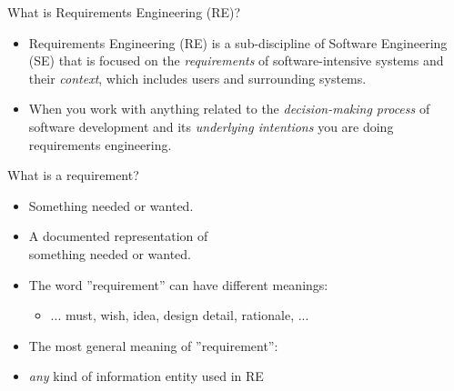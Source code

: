 \documentclass{beamer}
\begin{document}
\begin{frame}[fragile]{What is Requirements Engineering (RE)?}
\begin{itemize}
\item  Requirements Engineering (RE) is a sub-discipline of Software Engineering (SE) that is focused on the \textit{requirements} of software-intensive systems and their \textit{context}, which includes users and surrounding systems.
\item When you work with anything related to the \textit{decision-making process} of software development and its \emph{underlying intentions} you are doing requirements engineering.
\end{itemize}
\end{frame}

\begin{frame}[fragile]{What is a requirement?}
\begin{itemize}
\item Something needed or wanted.
\item A documented representation of \\something needed or wanted.
\item The word ''requirement'' can have different meanings:
\begin{itemize}
\item ... must, wish, idea, design detail, rationale, ...
\end{itemize}
\item The most general meaning of ''requirement'':
\item[] \emph{any} kind of information entity used in RE
\end{itemize}
\end{frame}
\end{document}
